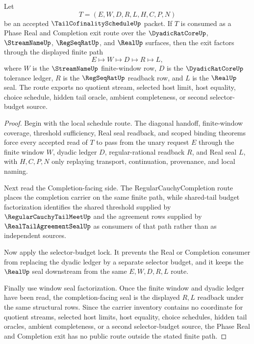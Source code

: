 \begin{theorem}
\label{thm:tail-cofinality-schedule-phase-real-completion-exit-handoff}
Let
$$
T=(E,W,D,R,L,H,C,P,N)
$$
be an accepted $\TailCofinalityScheduleUp$ packet. If $T$ is consumed as a Phase Real and Completion exit route over the $\DyadicRatCoreUp$, $\StreamNameUp$, $\RegSeqRatUp$, and $\RealUp$ surfaces, then the exit factors through the displayed finite path
$$
E \longmapsto W \longmapsto D \longmapsto R \longmapsto L,
$$
where $W$ is the $\StreamNameUp$ finite-window row, $D$ is the $\DyadicRatCoreUp$ tolerance ledger, $R$ is the $\RegSeqRatUp$ readback row, and $L$ is the $\RealUp$ seal. The route exports no quotient stream, selected host limit, host equality, choice schedule, hidden tail oracle, ambient completeness, or second selector-budget source.
\end{theorem}
\begin{proof}
Begin with the local schedule route. The diagonal handoff, finite-window coverage, threshold sufficiency, Real seal readback, and scoped binding theorems force every accepted read of $T$ to pass from the unary request $E$ through the finite window $W$, dyadic ledger $D$, regular-rational readback $R$, and Real seal $L$, with $H,C,P,N$ only replaying transport, continuation, provenance, and local naming.

Next read the Completion-facing side. The RegularCauchyCompletion route places the completion carrier on the same finite path, while shared-tail budget factorization identifies the shared threshold supplied by $\RegularCauchyTailMeetUp$ and the agreement rows supplied by $\RealTailAgreementSealUp$ as consumers of that path rather than as independent sources.

Now apply the selector-budget lock. It prevents the Real or Completion consumer from replacing the dyadic ledger by a separate selector budget, and it keeps the $\RealUp$ seal downstream from the same $E,W,D,R,L$ route.

Finally use window seal factorization. Once the finite window and dyadic ledger have been read, the completion-facing seal is the displayed $R,L$ readback under the same structural rows. Since the carrier inventory contains no coordinate for quotient streams, selected host limits, host equality, choice schedules, hidden tail oracles, ambient completeness, or a second selector-budget source, the Phase Real and Completion exit has no public route outside the stated finite path.
\end{proof}

